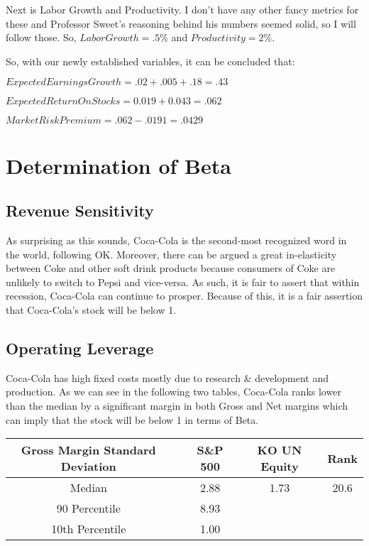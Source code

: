 \documentclass[11pt,letterpaper,english]{article}
\newcommand{\newpar}{\vspace{10mm}\noindent}
\begin{document}
\newpar
Next is Labor Growth and Productivity. I don't have any other fancy metrics
for these and Professor Sweet's reasoning behind his numbers seemed solid, so I will follow those.
So, $LaborGrowth = .5\%$ and $Productivity = 2\%$.

\newpar
So, with our newly established variables, it can be concluded that:

\begin{center}
$Expected Earnings Growth = .02 + .005 + .18 = .43$
\end{center}

\begin{center}
$ExpectedReturnOnStocks = 0.019 + 0.043 = .062$
\end{center}

\begin{center}
$MarketRiskPremium = .062 - .0191 = .0429$
\end{center}

\section*{Determination of Beta}

\subsection*{Revenue Sensitivity}
As surprising as this sounds, Coca-Cola is the second-most recognized word in the world, following OK.
Moreover, there can be argued a great in-elasticity between Coke and other soft drink products 
because consumers of Coke are unlikely to switch to Pepsi and vice-versa. As such, it is fair to
assert that within recession, Coca-Cola can continue to prosper. Because of this, it is a fair 
assertion that Coca-Cola's stock will be below 1.

\subsection*{Operating Leverage}
Coca-Cola has high fixed costs mostly due to research \& development and production. As we can see in
the following two tables, Coca-Cola ranks lower than the median by a significant margin in both Gross 
and Net margins which can imply that the stock will be below 1 in terms of Beta.

\begin{table}[h]
\centering
\begin{tabular}{|c|c|c|c|c|}
\hline
Gross Margin Standard Deviation  &  & S\&P 500 & KO UN Equity & Rank \\ \hline
Median     &  & 2.88     & 1.73         & 20.6 \\ \hline
90 Percentile   &  & 8.93     &              &      \\ \hline
10th Percentile &  & 1.00     &              &      \\ \hline
\end{tabular}
\end{table}
\end{document}
